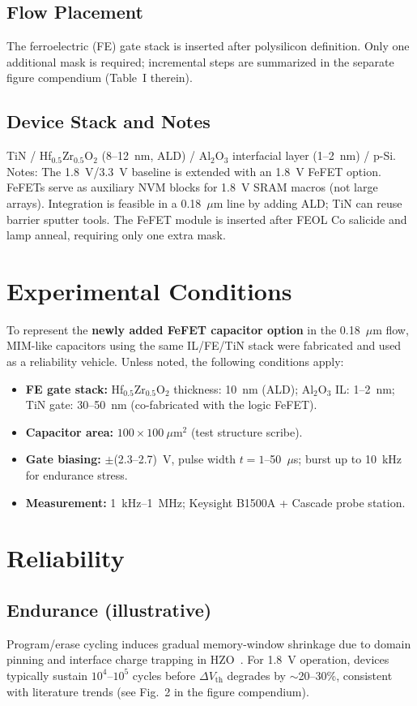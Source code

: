 \documentclass[conference]{IEEEtran}
\begin{document}
\subsection{Flow Placement}
The ferroelectric (FE) gate stack is inserted after polysilicon definition. Only one additional mask is required; incremental steps are summarized in the separate figure compendium (Table~I therein).

\subsection{Device Stack and Notes}
TiN / Hf$_{0.5}$Zr$_{0.5}$O$_2$ (8--12~nm, ALD) / Al$_2$O$_3$ interfacial layer (1--2~nm) / p-Si. Notes: The 1.8~V/3.3~V baseline is extended with an 1.8~V FeFET option. FeFETs serve as auxiliary NVM blocks for 1.8~V SRAM macros (not large arrays). Integration is feasible in a 0.18~$\mu$m line by adding ALD; TiN can reuse barrier sputter tools. The FeFET module is inserted after FEOL Co salicide and lamp anneal, requiring only one extra mask.

\section{Experimental Conditions}
To represent the \textbf{newly added FeFET capacitor option} in the 0.18~$\mu$m flow, MIM-like capacitors using the same IL/FE/TiN stack were fabricated and used as a reliability vehicle. Unless noted, the following conditions apply:
\begin{itemize}
  \item \textbf{FE gate stack:} Hf$_{0.5}$Zr$_{0.5}$O$_2$ thickness: 10~nm (ALD); Al$_2$O$_3$ IL: 1--2~nm; TiN gate: 30--50~nm (co-fabricated with the logic FeFET).
  \item \textbf{Capacitor area:} $100 \times 100~\mu$m$^2$ (test structure scribe).
  \item \textbf{Gate biasing:} $\pm$(2.3--2.7)~V, pulse width $t = 1$--50~$\mu$s; burst up to 10~kHz for endurance stress.
  \item \textbf{Measurement:} 1~kHz--1~MHz; Keysight B1500A + Cascade probe station.
\end{itemize}

\section{Reliability}
\subsection{Endurance (illustrative)}
Program/erase cycling induces gradual memory-window shrinkage due to domain pinning and interface charge trapping in HZO~\cite{Boscke2011,Mueller2012}. For 1.8~V operation, devices typically sustain $10^4$--$10^5$ cycles before $\Delta V_\mathrm{th}$ degrades by $\sim$20--30\%, consistent with literature trends (see Fig.~2 in the figure compendium).
\end{document}
